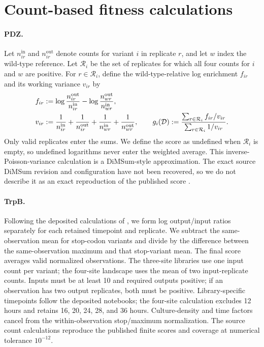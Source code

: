 \section{Count-based fitness calculations}
\label{app:scores}

\paragraph{PDZ.}
Let $n_{ir}^{\mathrm{in}}$ and $n_{ir}^{\mathrm{out}}$ denote counts for
variant $i$ in replicate $r$, and let $w$ index the wild-type reference. Let
$\mathcal R_i$ be the set of replicates for which all four counts for $i$
and $w$ are positive. For $r\in\mathcal R_i$, define the wild-type-relative
log enrichment $f_{ir}$ and its working variance $v_{ir}$ by
\begin{align}
f_{ir}&:=\log\frac{n_{ir}^{\mathrm{out}}}{n_{ir}^{\mathrm{in}}}
-\log\frac{n_{wr}^{\mathrm{out}}}{n_{wr}^{\mathrm{in}}},\\
v_{ir}&:=\frac{1}{n_{ir}^{\mathrm{in}}}+\frac{1}{n_{ir}^{\mathrm{out}}}
+\frac{1}{n_{wr}^{\mathrm{in}}}+\frac{1}{n_{wr}^{\mathrm{out}}},\qquad
g_i(\mathcal{D}):=\frac{\sum_{r\in\mathcal R_i} f_{ir}/v_{ir}}
{\sum_{r\in\mathcal R_i}1/v_{ir}}.
\end{align}
Only valid replicates enter the sums. We define the score as undefined when
$\mathcal R_i$ is empty, so undefined logarithms never enter the weighted
average. This inverse-Poisson-variance calculation is a DiMSum-style
approximation. The exact source DiMSum revision and configuration have not
been recovered, so we do not describe it as an exact reproduction of the
published score \citep{faure2020,zarin2024}.

\paragraph{TrpB.}
Following the deposited calculations of \citet{johnston2024}, we form log
output/input ratios separately for each retained timepoint and replicate.
We subtract the same-observation mean for stop-codon variants and divide by
the difference between the same-observation maximum and that stop-variant
mean. The final score averages valid normalized observations. The three-site
libraries use one input count per variant; the four-site landscape uses the
mean of two input-replicate counts. Inputs must be at least 10 and required
outputs positive; if an observation has two output replicates, both must be
positive. Library-specific timepoints follow the deposited notebooks; the
four-site calculation excludes 12 hours and retains 16, 20, 24, 28, and
36 hours. Culture-density and time factors cancel from the within-observation
stop/maximum normalization. The source count calculations reproduce the
published finite scores and coverage at numerical tolerance $10^{-12}$.

